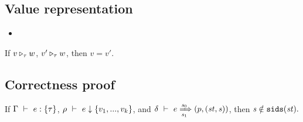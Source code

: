 \subsection{Value representation}
\begin{itemize}

\item {}



\begin{comment}
\PT{
	\AC{\ValRep {\lrange{v_1}{v_k}} {\tau} {\v}}
	\UC{\ValRep {\Seqk{v}}{\tseq{\tau}}{(\v,\langle \F_1,..., \F_k, \T \rangle)}}
}\\[4ex]

\item \Jug{\ValRep{\lrange{v_1}{v_k}}{\tau}{\v}}
\PT{
	\Axiom{\ValRep{\lrange{n_1}{n_k}}{\int}{\vrange{n_1}{n_k}}}
}
\PT{
	\AC{\ValRep{v_i}{\tau}{\v}}
	\UC{\ValRep{\lrange{v_1}{v_k}}{\tseq{\tau}}{}}
}

\end{comment}

\end{itemize}

\begin{lem}
	If $\ValRep{v}{\tau}{w}$, $\ValRep{v'}{\tau}{w}$,
	then $v=v'$.
\end{lem}


\subsection{Correctness proof}

\begin{lem}[???] \label{lem-seqs-sids}
	If $\Type{\Gam}{e}{\tseq{\tau}}$,  $\Eval{\rho}{e}{\Seqk{v}}$,
	and $\Trans{\del}{e}{\s_0}{\s_1}{\sfun{p}{(\st,\s)}}$,
	then $\s \notin \sids{\st}.$
\end{lem}

